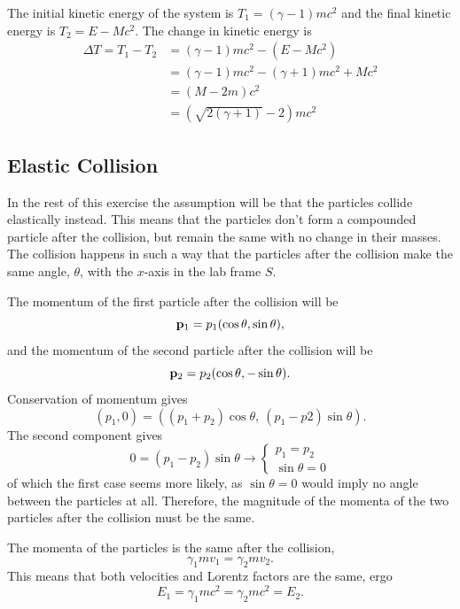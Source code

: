 \documentclass[11pt]{amsart}
\begin{document}
The initial kinetic energy of the system is $T_1 = (\gamma-1)mc^2$ and the final kinetic energy is $T_2 = E - Mc^2$. The change in kinetic energy is
\begin{align}
\Delta T = T_1 - T_2 	&= (\gamma - 1)mc^2 - (E-Mc^2) \nonumber \\
						&= (\gamma - 1)mc^2 - (\gamma + 1)mc^2 + Mc^2 \nonumber \\
						&= (M - 2m)c^2 \nonumber \\
						&= (\sqrt{2(\gamma + 1)} - 2)mc^2
\end{align}

\subsection{Elastic Collision}
In the rest of this exercise the assumption will be that the particles collide elastically instead. This means that the particles don't form a compounded particle after the collision, but remain the same with no change in their masses. The collision happens in such a way that the particles after the collision make the same angle, $\theta$, with the $x$-axis in the lab frame $S$.

The momentum of the first particle after the collision will be
\begin{equation}
\vb{p}_1 = p_1(\cos\theta, \sin\theta),
\end{equation}
and the momentum of the second particle after the collision will be
\begin{equation}
\vb{p}_2 = p_2(\cos\theta, -\sin\theta).
\end{equation}
Conservation of momentum gives
\begin{equation}
(p_1, 0) = ((p_1 + p_2)\cos\theta,\ (p_1 - p2)\sin\theta).
\end{equation}
The second component gives
\begin{equation}
0 = (p_1 - p_2)\sin\theta \rightarrow 
\begin{cases} 
p_1 = p_2 \\
\sin\theta = 0
\end{cases}
\end{equation}
of which the first case seems more likely, as $\sin\theta = 0$ would imply no angle between the particles at all. Therefore, the magnitude of the momenta of the two particles after the collision must be the same.

The momenta of the particles is the same after the collision,
\begin{equation}
\gamma_1 m v_1 = \gamma_2 m v_2 .
\end{equation}
This means that both velocities and Lorentz factors are the same, ergo
\begin{equation}
E_1 = \gamma_1 mc^2 = \gamma_2 mc^2 = E_2.
\end{equation} 
\end{document}
